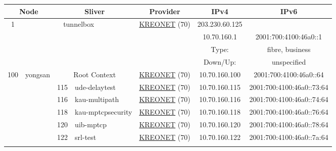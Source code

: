 \begin{small}
\begin{center}
\begin{longtable}{|c|c|c|c|c|c|c|c|}
 \multicolumn{2}{|p{8em}|}{Node} & \multicolumn{2}{|p{8em}|}{Sliver} & \multicolumn{2}{|p{8em}|}{Provider} & IPv4 & IPv6 \\ \hline
\endhead
 \multirow{4}{*}{\tiny{1}} & \multicolumn{3}{|c|}{\multirow{4}{*}{\tiny{tunnelbox}}} & \multicolumn{2}{|c|}{\multirow{4}{*}{\tiny{\href{http://www.kreonet.net}{KREONET} (70)}}} & \tiny{203.230.60.125} & \frownie{} \\* \cline{7-7}\cline{8-8}
  & \multicolumn{3}{|c|}{} & \multicolumn{2}{|c|}{} & \tiny{10.70.160.1} & \tiny{2001:700:4100:46a0::1} \\* \cline{7-7}\cline{8-8}
  & \multicolumn{3}{|c|}{} & \multicolumn{2}{|c|}{} & Type: & fibre, business \\* \cline{7-7}\cline{8-8}
  & \multicolumn{3}{|c|}{} & \multicolumn{2}{|c|}{} & Down/Up:  & unspecified \\ \hline
 \multirow{27}{*}{\tiny{100}} & \multicolumn{1}{|l|}{\multirow{27}{*}{\tiny{yongsan}}} & \multicolumn{2}{|c|}{\tiny{Root Context}} & \multicolumn{2}{|c|}{\tiny{\href{http://www.kreonet.net}{KREONET} (70)}} & \tiny{10.70.160.100} & \tiny{2001:700:4100:46a0::64} \\* \cline{3-3}\cline{4-4}\cline{5-5}\cline{6-6}\cline{7-7}\cline{8-8}
  &  & \tiny{115} & \multicolumn{1}{|l|}{\tiny{ude-delaytest}} & \multicolumn{2}{|c|}{\tiny{\href{http://www.kreonet.net}{KREONET} (70)}} & \tiny{10.70.160.115} & \tiny{2001:700:4100:46a0::73:64} \\* \cline{3-3}\cline{4-4}\cline{5-5}\cline{6-6}\cline{7-7}\cline{8-8}
  &  & \tiny{116} & \multicolumn{1}{|l|}{\tiny{kau-multipath}} & \multicolumn{2}{|c|}{\tiny{\href{http://www.kreonet.net}{KREONET} (70)}} & \tiny{10.70.160.116} & \tiny{2001:700:4100:46a0::74:64} \\* \cline{3-3}\cline{4-4}\cline{5-5}\cline{6-6}\cline{7-7}\cline{8-8}
  &  & \tiny{118} & \multicolumn{1}{|l|}{\tiny{kau-mptcpsecurity}} & \multicolumn{2}{|c|}{\tiny{\href{http://www.kreonet.net}{KREONET} (70)}} & \tiny{10.70.160.118} & \tiny{2001:700:4100:46a0::76:64} \\* \cline{3-3}\cline{4-4}\cline{5-5}\cline{6-6}\cline{7-7}\cline{8-8}
  &  & \tiny{120} & \multicolumn{1}{|l|}{\tiny{uib-mptcp}} & \multicolumn{2}{|c|}{\tiny{\href{http://www.kreonet.net}{KREONET} (70)}} & \tiny{10.70.160.120} & \tiny{2001:700:4100:46a0::78:64} \\* \cline{3-3}\cline{4-4}\cline{5-5}\cline{6-6}\cline{7-7}\cline{8-8}
  &  & \tiny{122} & \multicolumn{1}{|l|}{\tiny{srl-test}} & \multicolumn{2}{|c|}{\tiny{\href{http://www.kreonet.net}{KREONET} (70)}} & \tiny{10.70.160.122} & \tiny{2001:700:4100:46a0::7a:64} \\* \cline{3-3}\cline{4-4}\cline{5-5}\cline{6-6}\cline{7-7}\cline{8-8}

\end{longtable}
\end{center}
\end{small}
